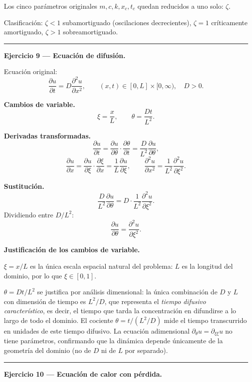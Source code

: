 \documentclass[12pt,letterpaper]{article}
\begin{document}
Los cinco parámetros originales $m,c,k,x_c,t_c$ quedan reducidos a uno solo: $\zeta$.

Clasificación:
$\zeta<1$ subamortiguado (oscilaciones decrecientes),
$\zeta=1$ críticamente amortiguado,
$\zeta>1$ sobreamortiguado.

\bigskip
\noindent\rule{\textwidth}{0.3pt}
\bigskip

\noindent\textbf{Ejercicio 9 — Ecuación de difusión.}

Ecuación original:
\[
  \frac{\partial u}{\partial t}=D\frac{\partial^2 u}{\partial x^2},
  \qquad (x,t)\in[0,L]\times[0,\infty),\quad D>0.
\]

\textbf{Cambios de variable.}
\[
  \xi=\frac{x}{L},\qquad
  \theta=\frac{Dt}{L^2}.
\]

\textbf{Derivadas transformadas.}
\[
  \frac{\partial u}{\partial t}
  =\frac{\partial u}{\partial\theta}\cdot\frac{\partial\theta}{\partial t}
  =\frac{D}{L^2}\frac{\partial u}{\partial\theta},
\]
\[
  \frac{\partial u}{\partial x}
  =\frac{\partial u}{\partial\xi}\cdot\frac{\partial\xi}{\partial x}
  =\frac{1}{L}\frac{\partial u}{\partial\xi},
  \qquad
  \frac{\partial^2 u}{\partial x^2}
  =\frac{1}{L^2}\frac{\partial^2 u}{\partial\xi^2}.
\]

\textbf{Sustitución.}
\[
  \frac{D}{L^2}\frac{\partial u}{\partial\theta}
  =D\cdot\frac{1}{L^2}\frac{\partial^2 u}{\partial\xi^2}.
\]
Dividiendo entre $D/L^2$:
\[
  \boxed{\frac{\partial u}{\partial\theta}=\frac{\partial^2 u}{\partial\xi^2}.}
\]

\textbf{Justificación de los cambios de variable.}

$\xi=x/L$ es la única escala espacial natural del problema:
$L$ es la longitud del dominio, por lo que $\xi\in[0,1]$.

$\theta=Dt/L^2$ se justifica por análisis dimensional: la única combinación
de $D$ y $L$ con dimensión de tiempo es $L^2/D$, que representa el
\emph{tiempo difusivo característico}, es decir, el tiempo que tarda la
concentración en difundirse a lo largo de todo el dominio.
El cociente $\theta=t/(L^2/D)$ mide el tiempo transcurrido en unidades de
este tiempo difusivo. La ecuación adimensional $\partial_\theta u=\partial_{\xi\xi}u$
no tiene parámetros, confirmando que la dinámica depende únicamente de la geometría
del dominio (no de $D$ ni de $L$ por separado).

\bigskip
\noindent\rule{\textwidth}{0.3pt}
\bigskip

\noindent\textbf{Ejercicio 10 — Ecuación de calor con pérdida.}
\end{document}
